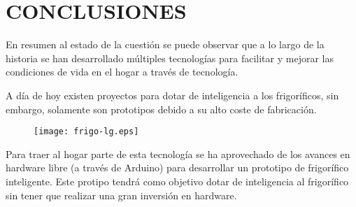 \section{CONCLUSIONES}

En resumen al estado de la cuestión se puede observar que a lo largo de la historia se han desarrollado múltiples tecnologías para facilitar y mejorar las condiciones de vida en el hogar a través de tecnología.

A día de hoy existen proyectos para dotar de inteligencia a los frigoríficos, sin embargo, solamente son prototipos debido a su alto coste de fabricación.

\begin{figure}[h!]
    \centering
    \texttt{[image: frigo-lg.eps]}
    \label{fig:frigo-lg}
\end{figure}

Para traer al hogar parte de esta tecnología se ha aprovechado de los avances en hardware libre (a través de Arduino) para desarrollar un prototipo de frigorífico inteligente. Este protipo tendrá como objetivo dotar de inteligencia al frigorífico sin tener que realizar una gran inversión en hardware.